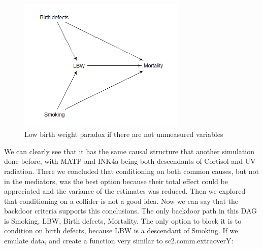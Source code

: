 \documentclass{article}
\begin{document}
\begin{figure}[h]
\caption{Low birth weight paradox if there are not unmeasured variables}
\includegraphics[width=8cm]{LBW3.DAG.png}
\centering
\end{figure}
We can clearly see that it has the same causal structure that another simulation done before, with MATP and INK4a being both descendants of Cortisol and UV radiation. There we concluded that conditioning on both common causes, but not in the mediators, was the best option because their total effect could be appreciated and the variance of the estimates was reduced. Then we explored that conditioning on a collider is not a good idea. Now we can say that the backdoor criteria supports this conclusions. The only backdoor path in this DAG is Smoking, LBW, Birth defects, Mortality. The only option to block it is to condition on birth defects, because LBW is a descendant of Smoking. If we emulate data, and create a function very similar to sc2.comm.extraoverY:\par
\end{document}
